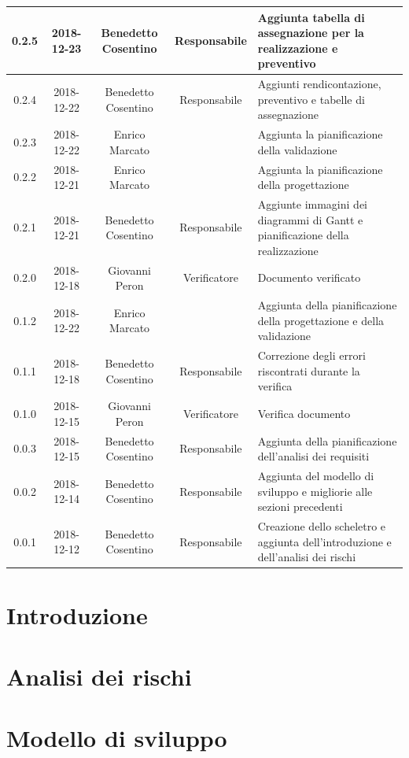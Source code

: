\documentclass[11pt,a4paper]{article}
\begin{document}
\begin{tabularx}{\textwidth}{ c | c | c | c | X }
		0.2.5 & 2018-12-23 & Benedetto Cosentino & Responsabile & Aggiunta tabella di assegnazione per la realizzazione e preventivo\\ \hline
		0.2.4 & 2018-12-22 & Benedetto Cosentino & Responsabile & Aggiunti rendicontazione, preventivo e tabelle di assegnazione \\ \hline
		0.2.3 & 2018-12-22 & Enrico Marcato &  & Aggiunta la pianificazione della validazione\\ \hline
		0.2.2 & 2018-12-21 & Enrico Marcato &  & Aggiunta la pianificazione della progettazione\\ \hline
		0.2.1 & 2018-12-21 & Benedetto Cosentino & Responsabile & Aggiunte immagini dei diagrammi di Gantt e pianificazione della realizzazione\\ \hline
		0.2.0 & 2018-12-18 & Giovanni Peron & Verificatore & Documento verificato\\ \hline
		0.1.2 & 2018-12-22 & Enrico Marcato &  & Aggiunta della pianificazione della progettazione e della validazione\\ \hline
		0.1.1 & 2018-12-18 & Benedetto Cosentino & Responsabile & Correzione degli errori riscontrati durante la verifica\\ \hline
		0.1.0 & 2018-12-15 & Giovanni Peron & Verificatore & Verifica documento\\ \hline
		0.0.3 & 2018-12-15 & Benedetto Cosentino & Responsabile & Aggiunta della pianificazione dell'analisi dei requisiti\\ \hline
		0.0.2 & 2018-12-14 & Benedetto Cosentino & Responsabile & Aggiunta del modello di sviluppo e migliorie alle sezioni precedenti\\ \hline
		0.0.1 & 2018-12-12 & Benedetto Cosentino & Responsabile & Creazione dello scheletro e aggiunta dell'introduzione e dell'analisi dei rischi\\ \hline
	\end{tabularx}
	\newpage
	\tableofcontents
	\listoffigures
	\listoftables
	\newpage	
	\section{Introduzione}
			
		\newpage	
	
	\section{Analisi dei rischi}
		
		\newpage	

	\section{Modello di sviluppo}
		
		\newpage	
\end{document}
